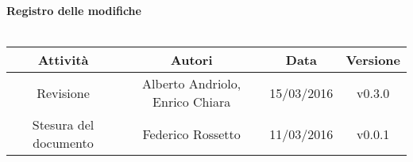 \vspace{1cm}
   {\fontsize{15pt}{16pt}\selectfont \textbf{Registro delle modifiche}}\\ \\

\bgroup
\def\arraystretch{1.6}
\begin{tabular}{| c | c | c | c |}
\hline
\textbf{Attività} & \textbf{Autori} & \textbf{Data} & \textbf{Versione}\\ \hline \hline


Revisione & Alberto Andriolo, Enrico Chiara& 15/03/2016 & v0.3.0 \\ \hline  

Stesura del documento & Federico Rossetto & 11/03/2016 & v0.0.1 \\ \hline 


\end{tabular}
\egroup
\newpage